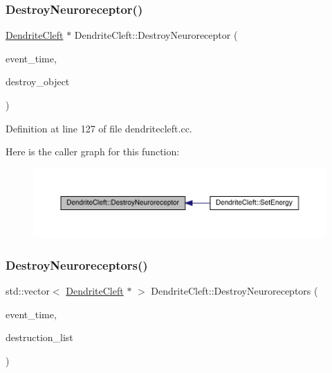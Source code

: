 \subsubsection{\texorpdfstring{Destroy\+Neuroreceptor()}{DestroyNeuroreceptor()}}
{\footnotesize\ttfamily \hyperlink{class_dendrite_cleft}{Dendrite\+Cleft} $\ast$ Dendrite\+Cleft\+::\+Destroy\+Neuroreceptor (\begin{DoxyParamCaption}\item[{std\+::chrono\+::time\+\_\+point$<$ \hyperlink{universe_8h_a0ef8d951d1ca5ab3cfaf7ab4c7a6fd80}{Clock} $>$}]{event\+\_\+time,  }\item[{\hyperlink{class_dendrite_cleft}{Dendrite\+Cleft} $\ast$}]{destroy\+\_\+object }\end{DoxyParamCaption})}



Definition at line 127 of file dendritecleft.\+cc.

Here is the caller graph for this function\+:\nopagebreak
\begin{figure}[H]
\begin{center}
\leavevmode
\includegraphics[width=350pt]{class_dendrite_cleft_a86e9943d9d140c2a06d7e222812c9548_icgraph}
\end{center}
\end{figure}
\mbox{\label{class_dendrite_cleft_a630e00e2d1108f2a43bcac9466e4681b}} 
\subsubsection{\texorpdfstring{Destroy\+Neuroreceptors()}{DestroyNeuroreceptors()}}
{\footnotesize\ttfamily std\+::vector$<$ \hyperlink{class_dendrite_cleft}{Dendrite\+Cleft} $\ast$ $>$ Dendrite\+Cleft\+::\+Destroy\+Neuroreceptors (\begin{DoxyParamCaption}\item[{std\+::chrono\+::time\+\_\+point$<$ \hyperlink{universe_8h_a0ef8d951d1ca5ab3cfaf7ab4c7a6fd80}{Clock} $>$}]{event\+\_\+time,  }\item[{std\+::vector$<$ \hyperlink{class_dendrite_cleft}{Dendrite\+Cleft} $\ast$$>$}]{destruction\+\_\+list }\end{DoxyParamCaption})}



